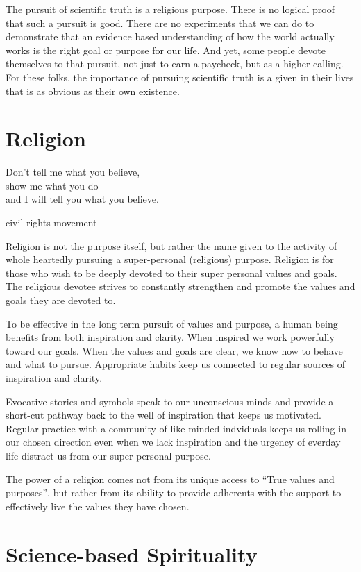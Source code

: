 \documentclass[ebook,12pt,openany,twoside]{memoir}
\begin{document}
The pursuit of scientific truth is a religious purpose. There is no logical
proof that such a pursuit is good. There are no experiments that we can do to
demonstrate that an evidence based understanding of how the world actually
works is the right goal or purpose for our life. And yet, some people devote
themselves to that pursuit, not just to earn a paycheck, but as a higher
calling. For these folks, the importance of pursuing scientific truth is a
given in their lives that is as obvious as their own existence.


\chapter{Religion}

\setlength\epigraphwidth{2.6in}
\epigraph{
  Don't tell me what you believe,\\
  show me what you do\\
  and I will tell you what you believe.
}{civil rights movement}


\noindent Religion is not the purpose itself, but rather the name given to the activity
of whole heartedly pursuing a super-personal (religious) purpose. Religion is
for those who wish to be deeply devoted to their super personal values and
goals. The religious devotee strives to constantly strengthen and promote the
values and goals they are devoted to.

To be effective in the long term pursuit of values and purpose, a human being
benefits from both inspiration and clarity. When inspired we work powerfully
toward our goals. When the values and goals are clear, we know how to behave
and what to pursue. Appropriate habits keep us connected to regular sources of
inspiration and clarity.

Evocative stories and symbols speak to our unconscious minds and provide a
short-cut pathway back to the well of inspiration that keeps us motivated.
Regular practice with a community of like-minded indviduals keeps us rolling in
our chosen direction even when we lack inspiration and the urgency of everday
life distract us from our super-personal purpose.

The power of a religion comes not from its unique access to ``True values and
purposes'', but rather from its ability to provide adherents with the support to
effectively live the values they have chosen.

\chapter{Science-based Spirituality}
\end{document}
